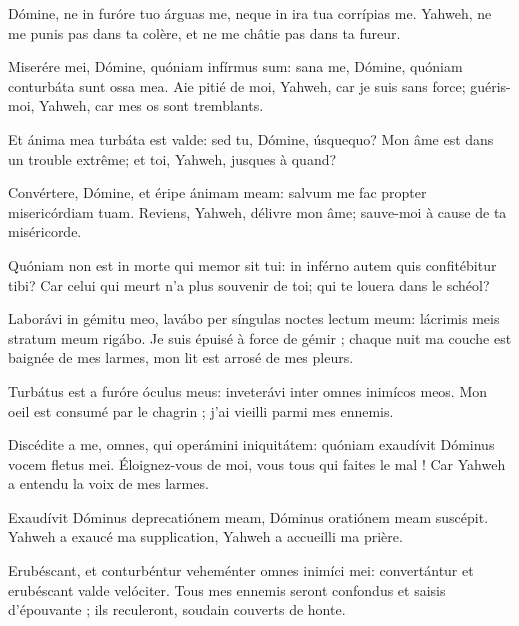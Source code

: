 \Gloria
{}
\begin{paracol}{2}

\LigneParacol{0cm}
{Dómine, ne in furóre tuo árguas me, \GreStar{} neque in ira tua corrípias me.}
{Yahweh, ne me punis pas dans ta colère, et ne me châtie pas dans ta fureur. }

\LigneParacol{0.2cm}
{Miserére mei, Dómine, quóniam infírmus sum: \GreStar{} sana me, Dómine, quóniam conturbáta sunt ossa mea.}
{Aie pitié de moi, Yahweh, car je suis sans force; guéris-moi, Yahweh, car mes os sont tremblants. }

\LigneParacol{0.2cm}
{Et ánima mea turbáta est valde: \GreStar{} sed tu, Dómine, úsquequo?}
{Mon âme est dans un trouble extrême; et toi, Yahweh, jusques à quand? }

\LigneParacol{0.2cm}
{Convértere, Dómine, et éripe ánimam meam: \GreStar{} salvum me fac propter misericórdiam tuam.}
{Reviens, Yahweh, délivre mon âme; sauve-moi à cause de ta miséricorde. }

\LigneParacol{0.2cm}
{Quóniam non est in morte qui memor sit tui: \GreStar{} in inférno autem quis confitébitur tibi?}
{Car celui qui meurt n'a plus souvenir de toi; qui te louera dans le schéol? }

\LigneParacol{0.2cm}
{Laborávi in gémitu meo, lavábo per síngulas noctes lectum meum: \GreStar{} lácrimis meis stratum meum rigábo.}
{Je suis épuisé à force de gémir ; chaque nuit ma couche est baignée de mes larmes, mon lit est arrosé de mes pleurs. }

\LigneParacol{0.2cm}
{Turbátus est a furóre óculus meus: \GreStar{} inveterávi inter omnes inimícos meos.}
{Mon oeil est consumé par le chagrin ; j'ai vieilli parmi mes ennemis. }

\LigneParacol{0.2cm}
{Discédite a me, omnes, qui operámini iniquitátem: \GreStar{} quóniam exaudívit Dóminus vocem fletus mei.}
{Éloignez-vous de moi, vous tous qui faites le mal ! Car Yahweh a entendu la voix de mes larmes. }

\LigneParacol{0.2cm}
{Exaudívit Dóminus deprecatiónem meam, \GreStar{} Dóminus oratiónem meam suscépit.}
{Yahweh a exaucé ma supplication, Yahweh a accueilli ma prière. }

\LigneParacol{0.2cm}
{Erubéscant, et conturbéntur veheménter omnes inimíci mei: \GreStar{} convertántur et erubéscant valde velóciter.}
{Tous mes ennemis seront confondus et saisis d'épouvante ; ils reculeront, soudain couverts de honte.  }

\end{paracol}
